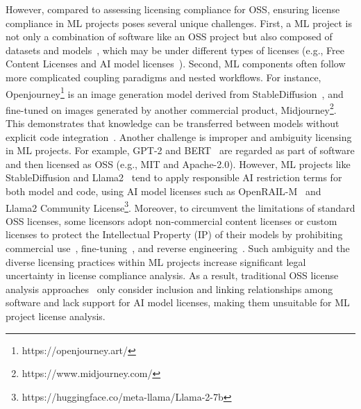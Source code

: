 However, compared to assessing licensing compliance for OSS, ensuring license compliance in ML projects poses several unique challenges. 
First, a ML project is not only a combination of software like an OSS project but also composed of datasets and models~\cite{han2021pre}, which may be under different types of licenses (e.g., Free Content Licenses and AI model licenses~\cite{contractor2022behavioral}).
Second, ML components often follow more complicated coupling paradigms and nested workflows. For instance, Openjourney\footnote{https://openjourney.art/} is an image generation model derived from StableDiffusion~\cite{rombach2022high}, and fine-tuned on images generated by another commercial product, Midjourney\footnote{https://www.midjourney.com/}.
This demonstrates that knowledge can be transferred between models without explicit code integration~\cite{you2021workshop}.
Another challenge is improper and ambiguity licensing in ML projects.
For example, GPT-2 and BERT~\cite{devlin2019bert} are regarded as part of software and then licensed as OSS (e.g., MIT and Apache-2.0).
However, ML projects like StableDiffusion and Llama2~\cite{touvron2023llama} tend to apply responsible AI restriction terms for both model and code, using AI model licenses such as OpenRAIL-M~\cite{contractor2022behavioral} and Llama2 Community License\footnote{https://huggingface.co/meta-llama/Llama-2-7b}.
Moreover, to circumvent the limitations of standard OSS licenses, some licensors adopt non-commercial content licenses or custom licenses to protect the Intellectual Property (IP) of their models by prohibiting commercial use~\cite{huang2022layoutlmv3}, fine-tuning~\cite{dreamlike2023}, and reverse engineering~\cite{goyal2022vision}.
Such ambiguity and the diverse licensing practices within ML projects  increase significant legal uncertainty in license compliance analysis.
As a result, traditional OSS license analysis approaches~\cite{ombredanne2020free, mathur2012empirical} only consider inclusion and linking relationships among software and lack support for AI model licenses, making them unsuitable for ML project license analysis.

